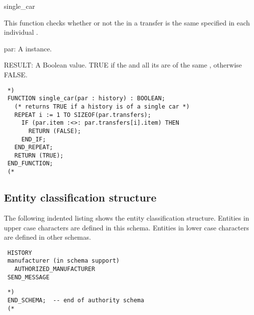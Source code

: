 \documentclass{article}
\begin{document}
 \begin{Mnamedesc}{single_car}
 \begin{Mdesctext}
     This function checks whether or not the  in a transfer
  is the same  specified in each individual
 .
 \end{Mdesctext}

 \begin{Ipars}

 \item[par:] A  instance.

 \item[RESULT:] A Boolean value. TRUE if the  and all its
  are of the same , otherwise FALSE.
 \end{Ipars}

 \begin{Mexp}
 \begin{verbatim}
 *)
 FUNCTION single_car(par : history) : BOOLEAN;
   (* returns TRUE if a history is of a single car *)
   REPEAT i := 1 TO SIZEOF(par.transfers);
     IF (par.item :<>: par.transfers[i].item) THEN
       RETURN (FALSE);
     END_IF;
   END_REPEAT;
   RETURN (TRUE);
 END_FUNCTION;
 (*
 \end{verbatim}
 \end{Mexp}
 \end{Mnamedesc}

 \subsection{Entity classification structure}

 The following indented listing shows the entity classification structure.
 Entities in upper case characters are defined in this schema. Entities in
 lower case characters are defined in other schemas.

 \begin{small}
 \begin{verbatim}
 HISTORY
 manufacturer (in schema support)
   AUTHORIZED_MANUFACTURER
 SEND_MESSAGE
 \end{verbatim}
 \end{small}

 \begin{small}
 \begin{verbatim}
 *)
 END_SCHEMA;  -- end of authority schema
 (*
 \end{verbatim}
 \end{small}
\end{document}
